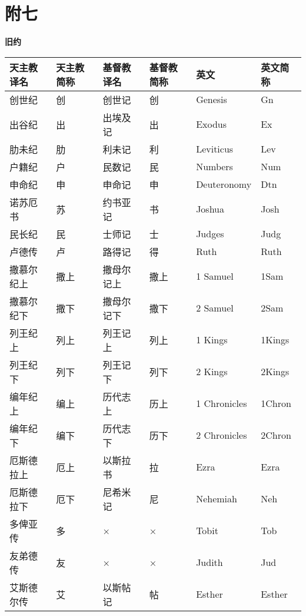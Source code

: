 \chapter*{附七}


\begin{center}
	\textbf{旧约}
\end{center}

\begin{longtable}{|l|l|l|l|l|l|}
	\hline 
	\textbf{天主教译名} & \textbf{天主教简称} & \textbf{基督教译名} & \textbf{基督教简称} & \textbf{英文} & \textbf{英文简称} \\ 
	\hline 
	创世纪 & 创 & 创世记 & 创 & Genesis & Gn \\
	\hline
	出谷纪 & 出 & 出埃及记 & 出 & Exodus & Ex \\
	\hline
	肋未纪 & 肋 & 利未记 & 利 & Leviticus & Lev \\
	\hline
	户籍纪 & 户 & 民数记 & 民 & Numbers & Num \\
	\hline
	申命纪 & 申 & 申命记 & 申 & Deuteronomy & Dtn \\
	\hline
	诺苏厄书 & 苏 & 约书亚记 & 书 & Joshua & Josh \\
	\hline
	民长纪 & 民 & 士师记 & 士 & Judges & Judg \\
	\hline
	卢德传 & 卢 & 路得记 & 得 & Ruth & Ruth \\
	\hline
	撒慕尔纪上 & 撒上 & 撒母尔记上 & 撒上 & 1 Samuel & 1Sam \\
	\hline
	撒慕尔纪下 & 撒下 & 撒母尔记下 & 撒下 & 2 Samuel & 2Sam \\
	\hline
	列王纪上 & 列上 & 列王记上 & 列上 & 1 Kings & 1Kings \\
	\hline
	列王纪下 & 列下 & 列王记下 & 列下 & 2 Kings & 2Kings \\
	\hline
	编年纪上 & 编上 & 历代志上 & 历上 & 1 Chronicles & 1Chron \\
	\hline
	编年纪下 & 编下 & 历代志下 & 历下 & 2 Chronicles & 2Chron \\
	\hline
	厄斯德拉上 & 厄上 & 以斯拉书 & 拉 & Ezra & Ezra \\
	\hline
	厄斯德拉下 & 厄下 & 尼希米记 & 尼 & Nehemiah & Neh \\
	\hline
	多俾亚传 & 多 & × & × & Tobit & Tob \\
	\hline
	友弟德传 & 友 & × & × & Judith & Jud \\
	\hline
	艾斯德尔传 & 艾 & 以斯帖记 & 帖 & Esther & Esther \\

\end{longtable}
